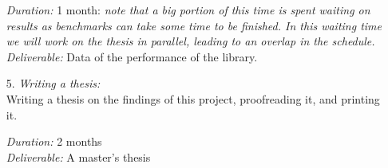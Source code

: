 \begin{itemize}
			  \textsl{Duration:} 1 month: \textsl{note that a big portion of this time is spent waiting on results as benchmarks can take some time to be finished. In this waiting time we will work on the thesis in parallel, leading to an overlap in the schedule.}\\
			  \textsl{Deliverable:} Data of the performance of the \qvasr library.

	\item[5.] \textsl{Writing a thesis:} \\
              Writing a thesis on the findings of this project, proofreading it, and printing it.

			  \textsl{Duration:} 2 months \\
			  \textsl{Deliverable:}	A master's thesis
\end{itemize}
